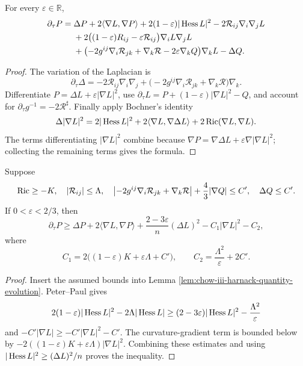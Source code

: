 \begin{lemma}
\label{lem:chow-iii-harnack-quantity-evolution}

For every \(\varepsilon\in\mathbb R\),
\[
\begin{aligned}
 \partial_\tau P={}&\Delta P+2\langle\nabla L,\nabla P\rangle
 +2(1-\varepsilon)|\operatorname{Hess} L|^2-2\mathcal R_{ij}\nabla_i\nabla_jL\\
 &+2\bigl((1-\varepsilon)R_{ij}-\varepsilon\mathcal R_{ij}\bigr)
   \nabla_iL\nabla_jL\\
 &+\bigl(-2g^{ij}\nabla_i\mathcal R_{jk}+\nabla_k\mathcal R
          -2\varepsilon\nabla_kQ\bigr)\nabla_kL-\Delta Q.
\end{aligned}
\]
\end{lemma}
\begin{proof}
\sketch The variation of the Laplacian is
\[
 \partial_\tau\Delta=-2\mathcal R_{ij}\nabla_i\nabla_j
 +\bigl(-2g^{ij}\nabla_i\mathcal R_{jk}+\nabla_k\mathcal R\bigr)\nabla_k.
\]
Differentiate \(P=\Delta L+\varepsilon|\nabla L|^2\), use
\(\partial_\tau L=P+(1-\varepsilon)|\nabla L|^2-Q\), and account for
\(\partial_\tau g^{-1}=-2\mathcal R^{\sharp}\).  Finally apply Bochner's
identity
\[
 \Delta|\nabla L|^2=2|\operatorname{Hess} L|^2
 +2\langle\nabla L,\nabla\Delta L\rangle
 +2\operatorname{Ric}(\nabla L,\nabla L).
\]
The terms differentiating \(|\nabla L|^2\) combine because
\(\nabla P=\nabla\Delta L+\varepsilon\nabla|\nabla L|^2\); collecting the
remaining terms gives the formula.
\end{proof}

\begin{corollary}
\label{cor:chow-iii-harnack-quantity-evolution-inequality}


Suppose
\[
 \operatorname{Ric}\geq-K,\quad |\mathcal R_{ij}|\leq\Lambda,
\quad
 \left|-2g^{ij}\nabla_i\mathcal R_{jk}+\nabla_k\mathcal R\right|
 +\frac43|\nabla Q|\leq C',\quad \Delta Q\leq C'.
\]
If \(0<\varepsilon<2/3\), then
\[
 \partial_\tau P\geq\Delta P+2\langle\nabla L,\nabla P\rangle
 +\frac{2-3\varepsilon}{n}(\Delta L)^2
 -C_1|\nabla L|^2-C_2,
\]
where
\[
 C_1=2\bigl((1-\varepsilon)K+\varepsilon\Lambda+C'\bigr),
 \qquad C_2=\frac{\Lambda^2}{\varepsilon}+2C'.
\]
\end{corollary}
\begin{proof}
\sketch Insert the assumed bounds into Lemma
\ref{lem:chow-iii-harnack-quantity-evolution}.  Peter--Paul gives
\[
 2(1-\varepsilon)|\operatorname{Hess} L|^2-2\Lambda|\operatorname{Hess} L|
 \geq(2-3\varepsilon)|\operatorname{Hess} L|^2-\frac{\Lambda^2}{\varepsilon}
\]
and
\(-C'|\nabla L|\geq-C'|\nabla L|^2-C'\).  The curvature-gradient term is
bounded below by
\(-2((1-\varepsilon)K+\varepsilon\Lambda)|\nabla L|^2\).
Combining these estimates and using
\(|\operatorname{Hess} L|^2\geq(\Delta L)^2/n\) proves the inequality.
\end{proof}

